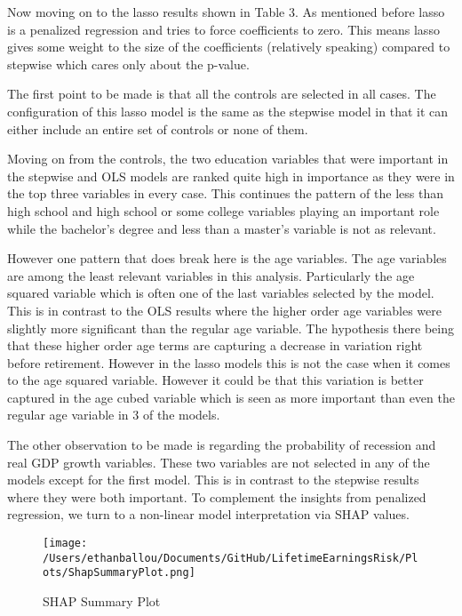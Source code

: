 \documentclass[12pt]{article}
\begin{document}
\begin{onehalfspace}



Now moving on to the lasso results shown in Table 3. As mentioned before lasso is a penalized regression and tries to force coefficients to zero. This means lasso gives some weight to the size of the coefficients (relatively speaking) compared to stepwise which cares only about the p-value. 

The first point to be made is that all the controls are selected in all cases. The configuration of this lasso model is the same as the stepwise model in that it can either include an entire set of controls or none of them. 

Moving on from the controls, the two education variables that were important in the stepwise and OLS models are ranked quite high in importance as they were in the top three variables in every case. This continues the pattern of the less than high school and high school or some college variables playing an important role while the bachelor's degree and less than a master's variable is not as relevant. 

However one pattern that does break here is the age variables. The age variables are among the least relevant variables in this analysis. Particularly the age squared variable which is often one of the last variables selected by the model. This is in contrast to the OLS results where the higher order age variables were slightly more significant than the regular age variable. The hypothesis there being that these higher order age terms are capturing a decrease in variation right before retirement. However in the lasso models this is not the case when it comes to the age squared variable. However it could be that this variation is better captured in the age cubed variable which is seen as more important than even the regular age variable in 3 of the models.

The other observation to be made is regarding the probability of recession and real GDP growth variables. These two variables are not selected in any of the models except for the first model. This is in contrast to the stepwise results where they were both important. To complement the insights from penalized regression, we turn to a non-linear model interpretation via SHAP values.



\begin{figure}[H]
    \centering
    \texttt{[image: /Users/ethanballou/Documents/GitHub/LifetimeEarningsRisk/Plots/ShapSummaryPlot.png]}
    \caption{SHAP Summary Plot}
\end{figure}




\end{onehalfspace}
\end{document}
